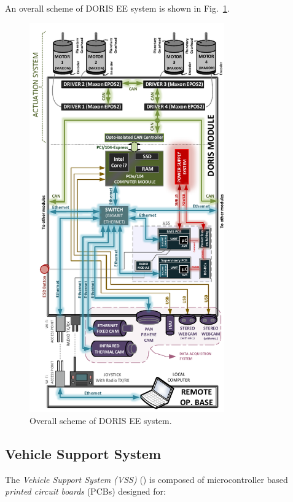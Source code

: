 \documentclass{ifacconf}
\begin{document}
An overall scheme of DORIS EE system is shown in Fig.~\ref{fig:EE-Communications}.

\begin{figure}
\centering
\includegraphics[width=8.4cm]{figs/EE-Communications-Geral.pdf}
\caption{Overall scheme of DORIS EE system.}
\label{fig:EE-Communications}
\end{figure} 

\subsection{Vehicle Support System}\label{sec:VSS}

The \emph{Vehicle Support System (VSS)} (\cite{MARIUS}) is composed of
microcontroller based \emph{printed circuit boards} (PCBs) designed for:
\end{document}
